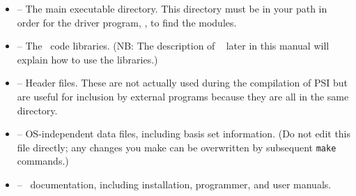 \begin{itemize}
\item {} -- The main executable directory.  This
  directory must be in your path in order for the driver program,
  , to find the modules.

\item {} -- The \PSIthree\ code libraries.  (NB: The
  description of \PSIthree\  later in this manual will
  explain how to use the libraries.)

\item {} -- Header files.  These are not actually
  used during the compilation of PSI but are useful for inclusion by
  external programs because they are all in the same directory.

\item {} -- OS-independent data files, including
  basis set information.  (Do not edit this file directly; any changes
  you make can be overwritten by subsequent {\tt make} commands.)

\item {} -- \PSIthree\ documentation, including
  installation, programmer, and user manuals.
\end{itemize}


